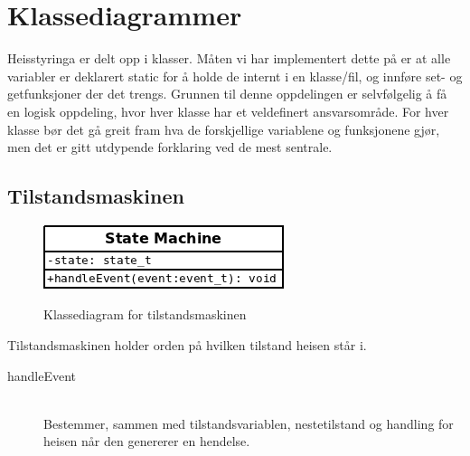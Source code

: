 \section{Klassediagrammer}
Heisstyringa er delt opp i klasser. Måten vi har implementert dette på er at alle variabler er deklarert static for å holde de internt i en klasse/fil, og innføre set- og getfunksjoner der det trengs. Grunnen til denne oppdelingen er selvfølgelig å få en logisk oppdeling, hvor hver klasse har et veldefinert ansvarsområde. For hver klasse bør det gå greit fram hva de forskjellige variablene og funksjonene gjør, men det er gitt utdypende forklaring ved de mest sentrale.
\subsection{Tilstandsmaskinen}
\begin{figure}
\centering
\includegraphics[scale=0.6]{stateMachine.png}
\label{klasse:SM}
\caption{Klassediagram for tilstandsmaskinen}
\end{figure}
Tilstandsmaskinen holder orden på hvilken tilstand heisen står i. 
\begin{description}
\item[handleEvent]\hfill \\
Bestemmer, sammen med tilstandsvariablen, nestetilstand og handling for heisen når den genererer en hendelse.
\end{description}
